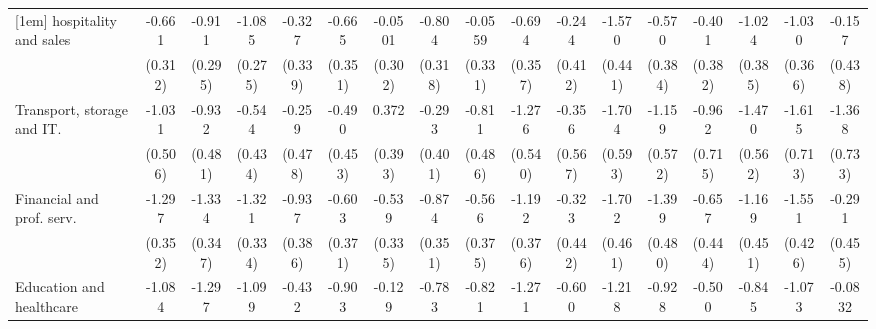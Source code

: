 {\begin{tabular}{l*{16}{c}}
[1em]
hospitality and sales&      -0.661\sym{*}  &      -0.911\sym{**} &      -1.085\sym{***}&      -0.327         &      -0.665         &     -0.0501         &      -0.804\sym{*}  &     -0.0559         &      -0.694         &      -0.244         &      -1.570\sym{***}&      -0.570         &      -0.401         &      -1.024\sym{**} &      -1.030\sym{**} &      -0.157         \\
                    &     (0.312)         &     (0.295)         &     (0.275)         &     (0.339)         &     (0.351)         &     (0.302)         &     (0.318)         &     (0.331)         &     (0.357)         &     (0.412)         &     (0.441)         &     (0.384)         &     (0.382)         &     (0.385)         &     (0.366)         &     (0.438)         \\
[1em]
Transport, storage and IT.&      -1.031\sym{*}  &      -0.932         &      -0.544         &      -0.259         &      -0.490         &       0.372         &      -0.293         &      -0.811         &      -1.276\sym{*}  &      -0.356         &      -1.704\sym{**} &      -1.159\sym{*}  &      -0.962         &      -1.470\sym{**} &      -1.615\sym{*}  &      -1.368         \\
                    &     (0.506)         &     (0.481)         &     (0.434)         &     (0.478)         &     (0.453)         &     (0.393)         &     (0.401)         &     (0.486)         &     (0.540)         &     (0.567)         &     (0.593)         &     (0.572)         &     (0.715)         &     (0.562)         &     (0.713)         &     (0.733)         \\
[1em]
Financial and prof. serv.&      -1.297\sym{***}&      -1.334\sym{***}&      -1.321\sym{***}&      -0.937\sym{*}  &      -0.603         &      -0.539         &      -0.874\sym{*}  &      -0.566         &      -1.192\sym{**} &      -0.323         &      -1.702\sym{***}&      -1.399\sym{**} &      -0.657         &      -1.169\sym{**} &      -1.551\sym{***}&      -0.291         \\
                    &     (0.352)         &     (0.347)         &     (0.334)         &     (0.386)         &     (0.371)         &     (0.335)         &     (0.351)         &     (0.375)         &     (0.376)         &     (0.442)         &     (0.461)         &     (0.480)         &     (0.444)         &     (0.451)         &     (0.426)         &     (0.455)         \\
[1em]
Education and healthcare&      -1.084\sym{**} &      -1.297\sym{***}&      -1.099\sym{***}&      -0.432         &      -0.903\sym{*}  &      -0.129         &      -0.783\sym{*}  &      -0.821\sym{*}  &      -1.271\sym{***}&      -0.600         &      -1.218\sym{**} &      -0.928\sym{*}  &      -0.500         &      -0.845\sym{*}  &      -1.073\sym{**} &     -0.0832         \\

\end{tabular}}
